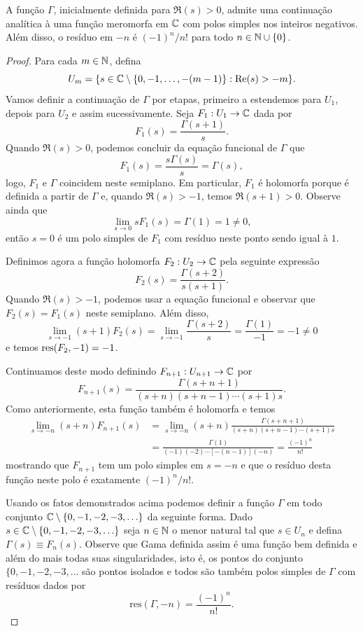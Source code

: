     \begin{teorema}
    \label{teo-cont-meromorfa-gamma}
        A função $\Gamma$, inicialmente definida para $\Re(s) > 0$, admite uma continuação analítica à uma função meromorfa em $\mathbb{C}$ com polos simples nos inteiros negativos. Além disso, o resíduo em $-n$ é $(-1)^{n}/n!$ para todo $n \in \mathbb{N} \cup \{0\}$.
    \end{teorema}
    \begin{proof}
    Para cada $m \in \mathbb{N}$, defina 
    \[
    U_m = \{s \in \mathbb{C} \setminus \{0,-1, \dots, -(m-1)\}: \mathrm{Re}(s) > -m \}.
    \]
    Vamos definir a continuação de $\Gamma$ por etapas, primeiro a estendemos para $U_1$, depois para $U_2$ e assim sucessivamente. Seja $F_1 : U_1 \to \mathbb{C}$ dada por
    $$F_1(s) = \frac{\Gamma(s+1)}{s}.$$
    Quando $\Re(s) > 0$, podemos concluir da equação funcional de $\Gamma$ que 
    $$F_1(s) = \frac{s\Gamma(s)}{s} = \Gamma(s),$$
    logo, $F_1$ e $\Gamma$ coincidem neste semiplano. Em particular, $F_1$ é holomorfa porque é definida a partir de $\Gamma$ e, quando $\Re(s)> -1$, temos $\Re(s+1) > 0$. Observe ainda que
    $$ \lim_{s \to 0} sF_1(s) = \Gamma(1) = 1 \neq 0,$$
    então $s=0$ é um polo simples de $F_1$ com resíduo neste ponto sendo igual à $1$.
    
    Definimos agora a função holomorfa $F_2 : U_2 \to \mathbb{C}$ 
    pela seguinte expressão
    $$F_2(s) = \frac{\Gamma(s+2)}{s(s+1)}.$$
    Quando $\Re(s) > -1$, podemos usar a equação funcional e observar que $F_2(s) = F_1(s)$ neste semiplano. Além disso, 
    $$ \lim_{s \to -1} (s+1)F_2(s) = \lim_{s \to -1} \frac{\Gamma(s+2)}{s} = \frac{\Gamma(1)}{-1} = -1 \neq 0$$
    e temos $\operatorname{res}(F_2,-1) = -1$. 
    
    Continuamos deste modo definindo $F_{n+1} : U_{n+1} \to \mathbb{C}$ por
    $$F_{n+1}(s) = \frac{\Gamma(s+n+1)}{(s+n)(s+n-1) \cdots (s+1)s}.$$
    Como anteriormente, esta função também é holomorfa e temos
    \begin{align*}
        \lim_{s \to -n} (s+n)F_{n+1}(s) &= \lim_{s \to -n} (s+n)\frac{\Gamma(s+n+1)}{(s+n)(s+n-1) \cdots (s+1)s} \\
        &= \frac{\Gamma(1)}{(-1)(-2) \cdots [-(n-1)](-n)} = \frac{(-1)^n}{n!}
    \end{align*}
    mostrando que $F_{n+1}$ tem um polo simples em $s=-n$ e que o resíduo desta função neste polo é exatamente $(-1)^n/n!$. 
    
    Usando os fatos demonstrados acima podemos definir a função $\Gamma$ em todo conjunto $\mathbb{C}\setminus \{0,-1,-2,-3,\ldots\}$
    da seguinte forma. 
    Dado $s\in \mathbb{C}\setminus \{0,-1,-2,-3,\ldots\}$ seja $n\in \mathbb{N}$
    o menor natural tal que $s\in U_n$ e defina $\Gamma(s) \equiv F_n(s)$. Observe que Gama definida assim é uma função bem definida e além do mais todas suas singularidades, 
    isto é, os pontos do conjunto $\{0,-1,-2,-3,\ldots$ são pontos isolados e todos são também polos simples de $\Gamma$ com resíduos dados por 
    \[
    \mathrm{res}(\Gamma,-n) = \frac{(-1)^n}{n!}.
    \]
    \end{proof}
    
